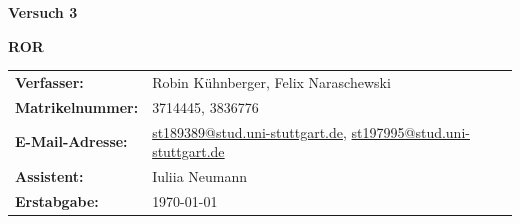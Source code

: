 \documentclass[12pt]{scrartcl} %
\begin{document}
\begin{titlepage}
  \begin{center}
    \vspace*{2cm}
    \begin{LARGE}
      \vspace*{1cm}
      \textbf{\textsf{Versuch 3 \\}}
    \end{LARGE}
    \vspace*{1cm}
    \textbf{\textsf{ROR}}\\
    \vspace*{1.5cm}
    \begin{table}[H]
      \sffamily
      \hspace*{3cm}
      \begin{tabular}{>{\bfseries}p{4cm}p{8cm}}
        Verfasser:      & Robin Kühnberger, Felix Naraschewski                                                                                                                       \\
        Matrikelnummer: & 3714445, 3836776                                                                                                                                           \\
        E-Mail-Adresse: & \href{mailto:st189389@stud.uni-stuttgart.de}{st189389@stud.uni-stuttgart.de}, \href{mailto:st197995@stud.uni-stuttgart.de}{st197995@stud.uni-stuttgart.de} \\
        Assistent:      & Iuliia Neumann                                                                                                                                             \\
        Erstabgabe:     & \today                                                                                                                                                     \\
      \end{tabular}
    \end{table}
  \end{center}
\end{titlepage}
\pagestyle{empty}        %
\tableofcontents
\clearpage               %
\pagestyle{scrheadings}  %





\newpage
{}

\printbibliography
\end{document}
